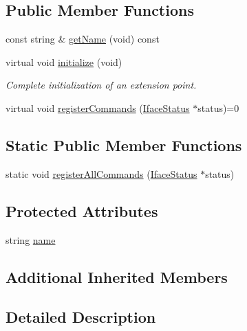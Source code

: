 \subsection*{Public Member Functions}
\begin{DoxyCompactItemize}
\item 
const string \& \mbox{\hyperlink{class_iface_capability_aee5adb75cdcd38edb6db0fcf86cba3af}{get\+Name}} (void) const
\item 
virtual void \mbox{\hyperlink{class_iface_capability_a65449e5d8ca98ab3febfa3dd23f451a4}{initialize}} (void)
\begin{DoxyCompactList}\small\item\em Complete initialization of an extension point. \end{DoxyCompactList}\item 
virtual void \mbox{\hyperlink{class_iface_capability_a8ed0987e781e5213db777be93e85af6e}{register\+Commands}} (\mbox{\hyperlink{class_iface_status}{Iface\+Status}} $\ast$status)=0
\end{DoxyCompactItemize}
\subsection*{Static Public Member Functions}
\begin{DoxyCompactItemize}
\item 
static void \mbox{\hyperlink{class_iface_capability_a0585d08799177d081f703f09e2ab18e4}{register\+All\+Commands}} (\mbox{\hyperlink{class_iface_status}{Iface\+Status}} $\ast$status)
\end{DoxyCompactItemize}
\subsection*{Protected Attributes}
\begin{DoxyCompactItemize}
\item 
string \mbox{\hyperlink{class_iface_capability_adaca15af193ff9e326a0f9f96a87e6e2}{name}}
\end{DoxyCompactItemize}
\subsection*{Additional Inherited Members}


\subsection{Detailed Description}


